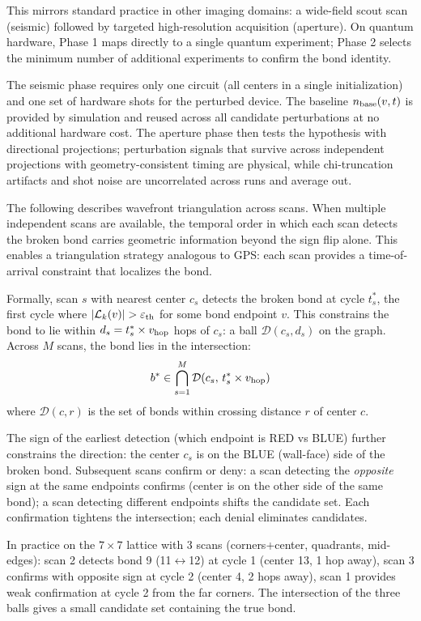 \documentclass[11pt]{article}
\begin{document}
This mirrors standard practice in other imaging domains: a wide-field scout scan
(seismic) followed by targeted high-resolution acquisition (aperture). On quantum
hardware, Phase 1 maps directly to a single quantum experiment; Phase 2 selects
the minimum number of additional experiments to confirm the bond identity.

The seismic phase requires only one circuit (all centers in a single
initialization) and one set of hardware shots for the perturbed device. The baseline $n_{\rm base}(v,t)$ is provided by
simulation and reused across all candidate perturbations at no additional
hardware cost. The aperture phase then tests the hypothesis with directional
projections; perturbation signals that survive across independent projections
with geometry-consistent timing are physical, while chi-truncation artifacts
and shot noise are uncorrelated across runs and average out.

The following describes wavefront triangulation across scans.
When multiple independent scans are available, the temporal order in which
each scan detects the broken bond carries geometric information beyond the
sign flip alone. This enables a triangulation strategy analogous to GPS:
each scan provides a time-of-arrival constraint that localizes the bond.

Formally, scan $s$ with nearest center $c_s$ detects the broken bond at
cycle $t_s^*$, the first cycle where $|\mathcal{L}_k(v)| > \varepsilon_{\rm th}$
for some bond endpoint $v$. This constrains the bond to lie within
$d_s = t_s^* \times v_{\rm hop}$ hops of $c_s$: a ball $\mathcal{D}(c_s, d_s)$
on the graph. Across $M$ scans, the bond lies in the intersection:
\begin{equation}
    b^* \in \bigcap_{s=1}^{M} \mathcal{D}(c_s,\, t_s^* \times v_{\rm hop})
\end{equation}
where $\mathcal{D}(c, r)$ is the set of bonds within crossing distance $r$ of center $c$.

The sign of the earliest detection (which endpoint is RED vs BLUE) further
constrains the direction: the center $c_s$ is on the BLUE (wall-face) side
of the broken bond. Subsequent scans confirm or deny: a scan detecting the
\emph{opposite} sign at the same endpoints confirms (center is on the other
side of the same bond); a scan detecting different endpoints shifts the
candidate set. Each confirmation tightens the intersection; each denial
eliminates candidates.

In practice on the $7\times7$ lattice with 3 scans (corners+center,
quadrants, mid-edges): scan 2 detects bond 9 (11$\leftrightarrow$12)
at cycle 1 (center 13, 1 hop away), scan 3 confirms with opposite sign at
cycle 2 (center 4, 2 hops away), scan 1 provides weak confirmation at
cycle 2 from the far corners. The intersection of the three balls gives
a small candidate set containing the true bond.
\end{document}

